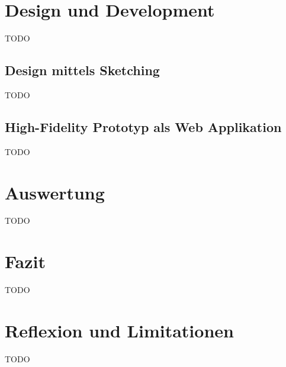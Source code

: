\documentclass[12pt, oneside]{article}
\begin{document}
\clearpage
\section{Design und Development}
TODO

\subsection{Design mittels Sketching}
TODO

\subsection{High-Fidelity Prototyp als Web Applikation}
TODO

\clearpage
\section{Auswertung}
TODO

\clearpage
\section{Fazit}
TODO

\clearpage
\section{Reflexion und Limitationen}
TODO


\clearpage



\clearpage
\end{document}
